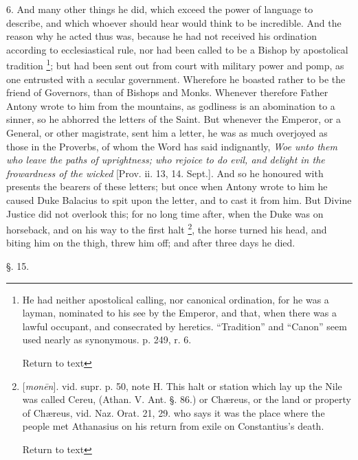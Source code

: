 6. And many other things he did, which exceed the
power of language to describe, and which whoever should hear would
think to be incredible. And the reason why he acted thus was, because
he had not received his ordination according to ecclesiastical rule,
nor had been called to be a Bishop by apostolical tradition \footnote{He had neither apostolical calling, nor canonical ordination, for he
was a layman, nominated to his see by the Emperor, and that, when
there was a lawful occupant, and consecrated by heretics. ``Tradition''
and ``Canon'' seem used nearly as synonymous. p. 249, r. 6.

Return to text}; but had been sent out from court with military power and pomp,
as one entrusted with a secular government. Wherefore he boasted
rather to be the friend of Governors, than of Bishops and Monks.
Whenever therefore Father Antony wrote to him from the mountains, as
godliness is an abomination to a sinner, so he abhorred the letters of
the Saint. But whenever the Emperor, or a General, or other
magistrate, sent him a letter, he was as much overjoyed as those in
the Proverbs, of whom the Word has said indignantly, \emph{Woe
unto them who leave the paths of uprightness; who rejoice to do evil,
and delight in the frowardness of the wicked} [Prov. ii. 13, 14.
Sept.]. And so he honoured with presents the bearers of these letters;
but once when Antony wrote to him he caused Duke Balacius to spit upon
the letter, and to cast it from him. But Divine Justice did not
overlook this; for no long time after, when the Duke was on horseback,
and on his way to the first halt \footnote{[\emph{mon\={e}n}]. vid. supr.
p. 50, note H. This halt or station which lay up the Nile was called
Cereu, (Athan. V. Ant. §. 86.) or Chæreus, or the land or property
of Chæreus, vid. Naz. Orat. 21, 29. who says it was the place where
the people met Athanasius on his return from exile on Constantius's
death.

Return to text

}, the horse turned his head, and biting him on the thigh, threw
him off; and after three days he died.


§. 15.

